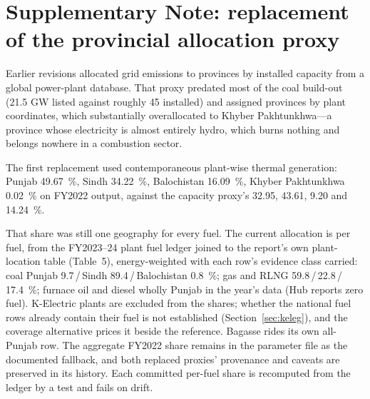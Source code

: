 \section{Supplementary Note: replacement of the provincial allocation proxy}
\label{app:provincial}

Earlier revisions allocated grid emissions to provinces by installed capacity from a global
power-plant database. That proxy predated most of the coal build-out (\SI{21.5}{} GW listed
against roughly \SI{45}{} installed) and assigned provinces by plant coordinates, which
substantially overallocated to Khyber Pakhtunkhwa---a province whose electricity is almost
entirely hydro, which burns nothing and belongs nowhere in a combustion sector.

The first replacement used contemporaneous plant-wise thermal generation: Punjab
\SI{49.67}{\percent}, Sindh \SI{34.22}{\percent}, Balochistan \SI{16.09}{\percent},
Khyber Pakhtunkhwa \SI{0.02}{\percent} on FY2022 output, against the capacity proxy's
\SI{32.95}{}, \SI{43.61}{}, \SI{9.20}{} and \SI{14.24}{\percent}.

That share was still one geography for every fuel. The current allocation is per fuel,
from the FY2023--24 plant fuel ledger joined to the report's own plant-location table
(Table~5), energy-weighted with each row's evidence class carried: coal Punjab
\SI{9.7}{}\,/\,Sindh \SI{89.4}{}\,/\,Balochistan \SI{0.8}{\percent}; gas and RLNG
\SI{59.8}{}\,/\,\SI{22.8}{}\,/\,\SI{17.4}{\percent}; furnace oil and diesel wholly Punjab
in the year's data (Hub reports zero fuel). K-Electric plants are excluded from the
shares; whether the national fuel rows already contain their fuel is not established
(Section~\ref{sec:keleg}), and the coverage alternative prices it beside the reference.
Bagasse rides its own all-Punjab row. The aggregate FY2022 share
remains in the parameter file as the documented fallback, and both replaced proxies'
provenance and caveats are preserved in its history. Each committed per-fuel share is
recomputed from the ledger by a test and fails on drift.
